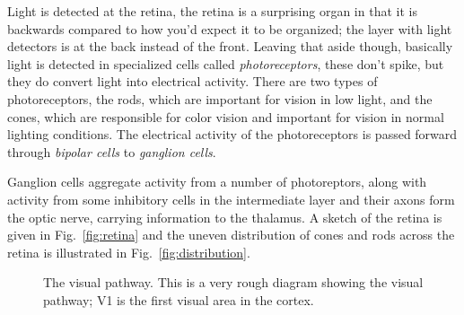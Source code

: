 \documentclass[11pt,a4paper]{scrartcl}
\begin{document}
Light is detected at the retina, the retina is a surprising organ in
that it is backwards compared to how you'd expect it to be organized;
the layer with light detectors is at the back instead of the
front. Leaving that aside though, basically light is detected in
specialized cells called \textsl{photoreceptors}, these don't spike,
but they do convert light into electrical activity. There are two
types of photoreceptors, the rods, which are important for vision in
low light, and the cones, which are responsible for color vision and
important for vision in normal lighting conditions. The electrical
activity of the photoreceptors is passed forward through \textsl{bipolar
  cells} to \textsl{ganglion cells}.

Ganglion cells aggregate activity from a number of photoreptors, along
with activity from some inhibitory cells in the intermediate layer and
their axons form the optic nerve, carrying information to the
thalamus. A sketch of the retina is given in Fig.~\ref{fig:retina} and the uneven distribution of cones and rods across the retina is illustrated in Fig.~\ref{fig:distribution}.

\begin{figure}
\begin{center}
\end{center}
\caption{The visual pathway. This is a very rough diagram showing the visual pathway; V1 is the first visual area in the cortex.\label{fig:pathway}}
\end{figure}
\end{document}
